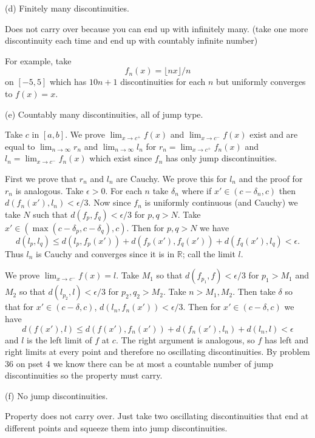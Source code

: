 \documentclass{amsart}
\begin{document}
\bigskip

(d) Finitely many discontinuities.

Does not carry over because you can end up with infinitely many. (take one more discontinuity each time and end up
with countably infinite number)

For example, take \[f_n(x) = \lfloor nx\rfloor/n\] on $[-5, 5]$ which has $10n+1$ discontinuities for each $n$
but uniformly converges to $f(x)=x$. 

\bigskip

(e) Countably many discontinuities, all of jump type.

\medskip \noindent Take $c$ in $[a,b]$. We prove $\lim_{x\to c^+}f(x)$ and $\lim_{x\to c^-}f(x)$ exist and
are equal to $\lim_{n\to\infty} r_n$ and $\lim_{n\to\infty} l_n$ for $r_n=\lim_{x\to c^+}f_n(x)$
and $l_n=\lim_{x\to c^-}f_n(x)$ which exist since $f_n$ has only jump discontinuities. 

\medskip \noindent First we prove that $r_n$ and $l_n$ are Cauchy. We prove this for $l_n$ and the proof for $r_n$ is analogous.
Take $\epsilon>0$. For each $n$ take $\delta_n$ where if $x'\in (c-\delta_n, c)$ then $d(f_n(x'), l_n)<\epsilon/3$. Now since
$f_n$ is uniformly continuous (and Cauchy) we take $N$ such that $d(f_p, f_q)<\epsilon/3$ for $p, q>N$. Take 
$x'\in (\max(c-\delta_p, c-\delta_q), c)$. Then for $p, q>N$ we have \[d(l_p, l_q)\leq d(l_p, f_p(x'))+d(f_p(x'), f_q(x'))+d(f_q(x'), l_q)<\epsilon. \]
Thus $l_n$ is Cauchy and converges since it is in $\mathbb{R}$; call the limit $l$. 

\medskip \noindent We prove $\lim_{x\to c^-}f(x)=l$.  
Take $M_1$ so that $d(f_{p_1}, f)<\epsilon/3$ for $p_1>M_1$ and $M_2$ so that $d(l_{p_2}, l)<\epsilon/3$
for $p_2, q_2>M_2$. Take $n>M_1,M_2$. Then take $\delta$ so that for $x'\in (c-\delta, c)$, $d(l_n, f_n(x'))<\epsilon/3$. 
Then for $x'\in (c-\delta, c)$ we have \[d(f(x'), l)\leq d(f(x'), f_n(x'))+d(f_n(x'), l_n) + d(l_n, l) < \epsilon\] and $l$ is 
the left limit of $f$ at $c$. The right argument is analogous, so $f$ has left and right limits at every point and therefore no
oscillating discontinuities. By problem 36 on pset 4 we know there can be at most a countable number of jump discontinuities so
the property must carry.

\bigskip

(f) No jump discontinuities.

\medskip \noindent Property does not carry over. Just take two oscillating discontinuities that end at different points and squeeze them
into jump discontinuities.
\end{document}
